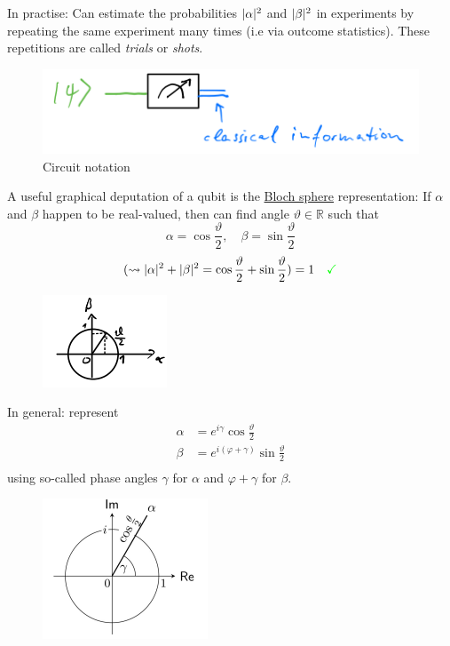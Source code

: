 In practise: Can estimate the probabilities $\lvert\alpha\rvert^2$ and $\lvert\beta\rvert^2$ in 
experiments by repeating the same experiment many times (i.e via outcome statistics).
These repetitions are called \textit{trials} or \textit{shots}.

\begin{figure}[h]
    \centering
    \includegraphics[scale=0.5]{chapters/res/circuit-notation.png}
    \caption{Circuit notation}
\end{figure}
\newpage

A useful graphical deputation of a qubit is the \underline{Bloch sphere} representation:
If $\alpha$ and $\beta$ happen to be real-valued, then can find angle 
$\vartheta \in \mathbb{R}$ such that
\begin{equation}
    \alpha = \cos{\frac{\vartheta}{2}}, \quad \beta = \sin{\frac{\vartheta}{2}}
\end{equation}
\begin{equation*}
    (\leadsto \lvert\alpha\rvert^2 + \lvert\beta\rvert^2 
    = \cos{\frac{\vartheta}{2}} + \sin{\frac{\vartheta}{2}}) = 1 \quad \color{green}\checkmark
\end{equation*}

\begin{figure}[h]
    \centering
    \includegraphics[scale=0.5]{chapters/res/bloch_sphere_sin_cos.png}
\end{figure}

In general: represent 
\begin{align*}
    \alpha &= e^{i \gamma} \cos{\frac{\vartheta}{2}} \\
    \beta &= e^{i (\varphi + \gamma)} \sin{\frac{\vartheta}{2}} \\
\end{align*}
using so-called phase angles $\gamma$ for $\alpha$ and $\varphi + \gamma$ for $\beta$.

\begin{figure}[h]
    \centering
    \includegraphics[scale=0.6]{chapters/res/sin-cos-complex.png}
\end{figure}

